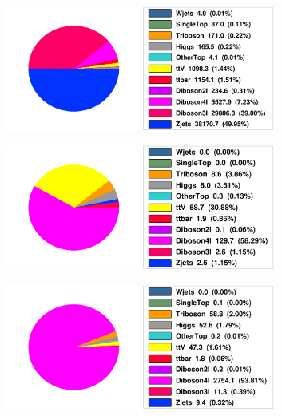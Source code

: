 \begin{figure}[htb]
    \centering
    \begin{subfigure}[b]{0.49\textwidth}
      \centering
      \includegraphics[width=0.98\textwidth]{figs/rpvthreel/bkgYields_SROL3l_noCuts.png}
      \caption{}
      \label{fig:pie_a}
    \end{subfigure}
    \hfill
    \begin{subfigure}[b]{0.49\textwidth}
      \centering
      \includegraphics[width=0.98\textwidth]{figs/rpvthreel/bkgYields_SRTL_noCuts.png}
      \caption{}
      \label{fig:pie_b}
    \end{subfigure}
    \hfill
    \begin{subfigure}[b]{0.49\textwidth}
      \centering
      \includegraphics[width=0.98\textwidth]{figs/rpvthreel/bkgYields_SROL4l_noCuts.png}

\end{subfigure}
\end{figure}
